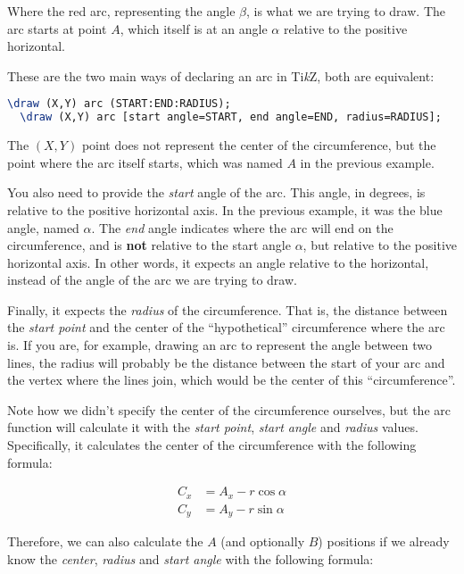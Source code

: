 \documentclass{amsart}
\newcommand{\TikZ}{Ti\textit{k}Z}
\begin{document}
Where the red arc, representing the angle $\beta$, is what we are trying to
draw. The arc starts at point $A$, which itself is at an angle $\alpha$ relative
to the positive horizontal.

These are the two main ways of declaring an arc in \TikZ, both are equivalent:

\begin{lstlisting}[language=tex]
  \draw (X,Y) arc (START:END:RADIUS);
  \draw (X,Y) arc [start angle=START, end angle=END, radius=RADIUS];
\end{lstlisting}

The $(X,Y)$ point does not represent the center of the circumference, but the
point where the arc itself starts, which was named $A$ in the previous example.

You also need to provide the \textit{start} angle of the arc. This angle, in
degrees, is relative to the positive horizontal axis. In the previous example,
it was the blue angle, named $\alpha$. The \textit{end} angle indicates where
the arc will end on the circumference, and is \textbf{not} relative to the start
angle $\alpha$, but relative to the positive horizontal axis. In other words, it
expects an angle relative to the horizontal, instead of the angle of the arc we
are trying to draw.

Finally, it expects the \textit{radius} of the circumference. That is, the
distance between the \textit{start point} and the center of the ``hypothetical''
circumference where the arc is. If you are, for example, drawing an arc to
represent the angle between two lines, the radius will probably be the distance
between the start of your arc and the vertex where the lines join, which would
be the center of this ``circumference''.

Note how we didn't specify the center of the circumference ourselves, but the
arc function will calculate it with the \textit{start point}, \textit{start
  angle} and \textit{radius} values. Specifically, it calculates the center of
the circumference with the following formula:

\begin{align*}
C_x &= A_x - r \cos \alpha \\
C_y &= A_y - r \sin \alpha
\end{align*}

Therefore, we can also calculate the $A$ (and optionally $B$) positions if we
already know the \textit{center}, \textit{radius} and \textit{start angle} with
the following formula:
\end{document}
